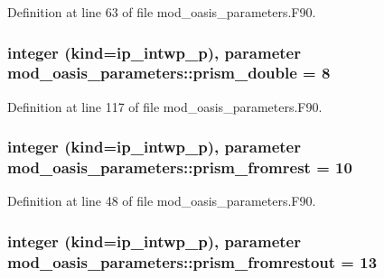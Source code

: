 Definition at line 63 of file mod\+\_\+oasis\+\_\+parameters.\+F90.

\hypertarget{classmod__oasis__parameters_a9527d2d640ea7d747143bf994ee9b206}{
\subsubsection[{prism\+\_\+double}]{\setlength{\rightskip}{0pt plus 5cm}integer (kind=ip\+\_\+intwp\+\_\+p), parameter mod\+\_\+oasis\+\_\+parameters\+::prism\+\_\+double = 8}}\label{classmod__oasis__parameters_a9527d2d640ea7d747143bf994ee9b206}


Definition at line 117 of file mod\+\_\+oasis\+\_\+parameters.\+F90.

\hypertarget{classmod__oasis__parameters_ad77e6f35280cf4e306f818f9ec815441}{
\subsubsection[{prism\+\_\+fromrest}]{\setlength{\rightskip}{0pt plus 5cm}integer (kind=ip\+\_\+intwp\+\_\+p), parameter mod\+\_\+oasis\+\_\+parameters\+::prism\+\_\+fromrest = 10}}\label{classmod__oasis__parameters_ad77e6f35280cf4e306f818f9ec815441}


Definition at line 48 of file mod\+\_\+oasis\+\_\+parameters.\+F90.

\hypertarget{classmod__oasis__parameters_ac989a8af875dd1765b1369814fd4eb9d}{
\subsubsection[{prism\+\_\+fromrestout}]{\setlength{\rightskip}{0pt plus 5cm}integer (kind=ip\+\_\+intwp\+\_\+p), parameter mod\+\_\+oasis\+\_\+parameters\+::prism\+\_\+fromrestout = 13}}\label{classmod__oasis__parameters_ac989a8af875dd1765b1369814fd4eb9d}


